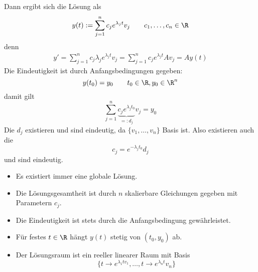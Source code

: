 \documentclass[a4paper,10pt]{scrbook}
\begin{document}
\begin{seg}[Fall 1: ${v_1,\dotsc, v_n}$ bildet eine Basis aus Eigenvektoren: $Av_j = \lambda_j v_j$]
	Dann ergibt sich die Lösung als
	\[
		y(t) := \sum_{j=1}^n c_j e^{\lambda_j t} v_j
		\qquad c_1,\dotsc, c_n \in \R
	\]
	denn
	\begin{align*}
		y' = \sum_{j=1}^n c_j \lambda_j e^{\lambda_j t} v_j = \sum_{j=1}^n c_j e^{\lambda_j t} Av_j = A y(t)
	\end{align*}
	Die Eindeutigkeit ist durch Anfangsbedingungen gegeben:
	\[
		y(t_0) = y_0
		\qquad t_0 \in \R, y_0 \in \R^n
	\]
	damit gilt	
	\[
		\sum_{j=1}^n \underbrace{c_j e^{\lambda_j t_0}}_{=:d_j} v_j = y_0
	\]
	Die $d_j$ existieren und sind eindeutig, da $\{v_1,\dotsc,v_n\}$ Basis ist.
	Also existieren auch die
	\[
		c_j  = e^{-\lambda_j t_0} d_j
	\]
	und sind eindeutig.

	\begin{note}[Beobachtungen]
		\begin{itemize}
			\item
				Es existiert immer eine globale Lösung.
			\item
				Die Lösungsgesamtheit ist durch $n$ skalierbare Gleichungen gegeben mit Parametern $c_j$.
			\item
				Die Eindeutigkeit ist stets durch die Anfangsbedingung gewährleistet.
			\item
				Für festes $t \in \R$ hängt $y(t)$ stetig von $(t_0, y_0)$ ab.
			\item
				Der Lösungsraum ist ein reeller linearer Raum mit Basis
				\[
					\{ t \to e^{\lambda_1 t v_1}, \dotsc, t\to e^{\lambda_n t}v_n\}
				\]
		\end{itemize}
	\end{note}
\end{seg}
\end{document}
